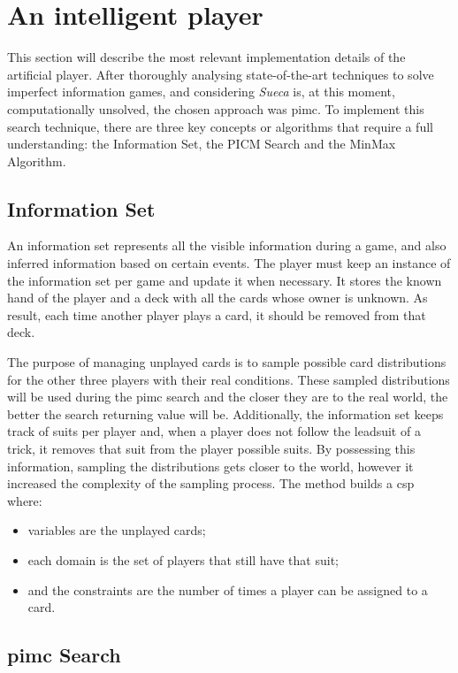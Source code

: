 \section{An intelligent player}%
\label{sec:artificial_player}

This section will describe the most relevant implementation details of the artificial player.
After thoroughly analysing state-of-the-art techniques to solve imperfect information games, and considering \emph{Sueca} is, at this moment, computationally unsolved, the chosen approach was \ac{pimc}.
To implement this search technique, there are three key concepts or algorithms that require a full understanding: the Information Set, the PICM Search and the MinMax Algorithm.

\subsection*{Information Set}

An information set represents all the visible information during a game, and also inferred information based on certain events.
The player must keep an instance of the information set per game and update it when necessary.
It stores the known hand of the player and a deck with all the cards whose owner is unknown.
As result, each time another player plays a card, it should be removed from that deck.

The purpose of managing unplayed cards is to sample possible card distributions for the other three players with their real conditions.
These sampled distributions will be used during the \ac{pimc} search and the closer they are to the real world, the better the search returning value will be.
Additionally, the information set keeps track of suits per player and, when a player does not follow the leadsuit of a trick, it removes that suit from the player possible suits.
By possessing this information, sampling the distributions gets closer to the world, however it increased the complexity of the sampling process.
The method builds a \ac{csp} where:
\begin{itemize}
\item variables are the unplayed cards;
\item each domain is the set of players that still have that suit;
\item and the constraints are the number of times a player can be assigned to a card.
\end{itemize}


\subsection*{\ac{pimc} Search}

